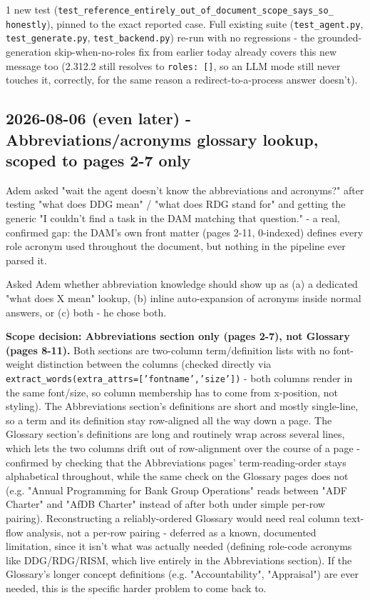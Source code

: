 1 new test (\texttt{test\_\allowbreak{}reference\_\allowbreak{}entirely\_\allowbreak{}out\_\allowbreak{}of\_\allowbreak{}document\_\allowbreak{}scope\_\allowbreak{}says\_\allowbreak{}so\_\allowbreak{} honestly}), pinned to the exact reported case. Full existing suite (\texttt{test\_\allowbreak{}agent.py}, \texttt{test\_\allowbreak{}generate.py}, \texttt{test\_\allowbreak{}backend.py}) re-run with no regressions - the grounded-generation skip-when-no-roles fix from earlier today already covers this new message too (2.312.2 still resolves to \texttt{roles: []}, so an LLM mode still never touches it, correctly, for the same reason a redirect-to-a-process answer doesn't).

\subsection*{2026-08-06 (even later) - Abbreviations/acronyms glossary lookup, scoped to pages 2-7 only}
Adem asked "wait the agent doesn't know the abbreviations and acronyms?" after testing "what does DDG mean" / "what does RDG stand for" and getting the generic "I couldn't find a task in the DAM matching that question." - a real, confirmed gap: the DAM's own front matter (pages 2-11, 0-indexed) defines every role acronym used throughout the document, but nothing in the pipeline ever parsed it.

Asked Adem whether abbreviation knowledge should show up as (a) a dedicated "what does X mean" lookup, (b) inline auto-expansion of acronyms inside normal answers, or (c) both - he chose both.

\textbf{Scope decision: Abbreviations section only (pages 2-7), not Glossary (pages 8-11).} Both sections are two-column term/definition lists with no font-weight distinction between the columns (checked directly via \texttt{extract\_\allowbreak{}words(extra\_\allowbreak{}attrs=['fontname','size'])} - both columns render in the same font/size, so column membership has to come from x-position, not styling). The Abbreviations section's definitions are short and mostly single-line, so a term and its definition stay row-aligned all the way down a page. The Glossary section's definitions are long and routinely wrap across several lines, which lets the two columns drift out of row-alignment over the course of a page - confirmed by checking that the Abbreviations pages' term-reading-order stays alphabetical throughout, while the same check on the Glossary pages does not (e.g. "Annual Programming for Bank Group Operations" reads between "ADF Charter" and "AfDB Charter" instead of after both under simple per-row pairing). Reconstructing a reliably-ordered Glossary would need real column text-flow analysis, not a per-row pairing - deferred as a known, documented limitation, since it isn't what was actually needed (defining role-code acronyms like DDG/RDG/RISM, which live entirely in the Abbreviations section). If the Glossary's longer concept definitions (e.g. "Accountability", "Appraisal") are ever needed, this is the specific harder problem to come back to.

